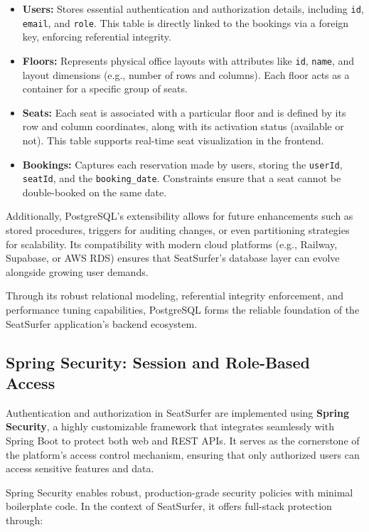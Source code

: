 \documentclass[12pt,a4paper]{report} %
\begin{document}
\begin{itemize}
\item \textbf{Users:} Stores essential authentication and authorization details, including \texttt{id}, \texttt{email}, and \texttt{role}. This table is directly linked to the bookings via a foreign key, enforcing referential integrity.
\item \textbf{Floors:} Represents physical office layouts with attributes like \texttt{id}, \texttt{name}, and layout dimensions (e.g., number of rows and columns). Each floor acts as a container for a specific group of seats.
\item \textbf{Seats:} Each seat is associated with a particular floor and is defined by its row and column coordinates, along with its activation status (available or not). This table supports real-time seat visualization in the frontend.
\item \textbf{Bookings:} Captures each reservation made by users, storing the \texttt{userId}, \texttt{seatId}, and the \texttt{booking\_date}. Constraints ensure that a seat cannot be double-booked on the same date.
\end{itemize}

Additionally, PostgreSQL's extensibility allows for future enhancements such as stored procedures, triggers for auditing changes, or even partitioning strategies for scalability. Its compatibility with modern cloud platforms (e.g., Railway, Supabase, or AWS RDS) ensures that SeatSurfer's database layer can evolve alongside growing user demands.

Through its robust relational modeling, referential integrity enforcement, and performance tuning capabilities, PostgreSQL forms the reliable foundation of the SeatSurfer application's backend ecosystem.

\subsection{Spring Security: Session and Role-Based Access}

Authentication and authorization in SeatSurfer are implemented using \textbf{Spring Security}, a highly customizable framework that integrates seamlessly with Spring Boot to protect both web and REST APIs. It serves as the cornerstone of the platform's access control mechanism, ensuring that only authorized users can access sensitive features and data.

Spring Security enables robust, production-grade security policies with minimal boilerplate code. In the context of SeatSurfer, it offers full-stack protection through:
\end{document}
